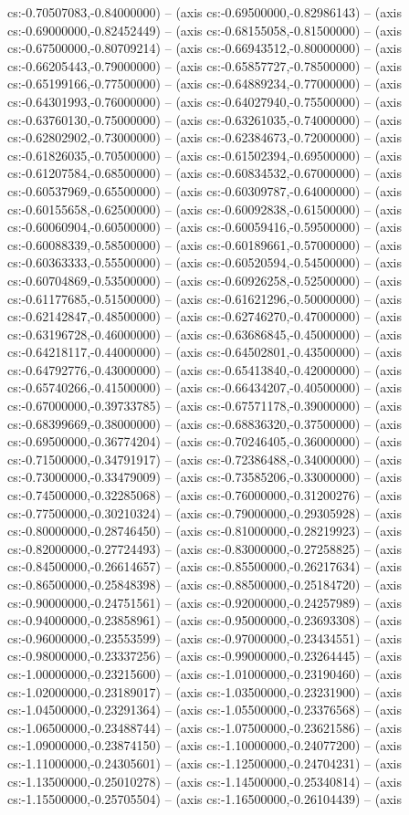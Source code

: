 cs:-0.70507083,-0.84000000) -- (axis cs:-0.69500000,-0.82986143) -- (axis cs:-0.69000000,-0.82452449) -- (axis cs:-0.68155058,-0.81500000) -- (axis cs:-0.67500000,-0.80709214) -- (axis cs:-0.66943512,-0.80000000) -- (axis cs:-0.66205443,-0.79000000) -- (axis cs:-0.65857727,-0.78500000) -- (axis cs:-0.65199166,-0.77500000) -- (axis cs:-0.64889234,-0.77000000) -- (axis cs:-0.64301993,-0.76000000) -- (axis cs:-0.64027940,-0.75500000) -- (axis cs:-0.63760130,-0.75000000) -- (axis cs:-0.63261035,-0.74000000) -- (axis cs:-0.62802902,-0.73000000) -- (axis cs:-0.62384673,-0.72000000) -- (axis cs:-0.61826035,-0.70500000) -- (axis cs:-0.61502394,-0.69500000) -- (axis cs:-0.61207584,-0.68500000) -- (axis cs:-0.60834532,-0.67000000) -- (axis cs:-0.60537969,-0.65500000) -- (axis cs:-0.60309787,-0.64000000) -- (axis cs:-0.60155658,-0.62500000) -- (axis cs:-0.60092838,-0.61500000) -- (axis cs:-0.60060904,-0.60500000) -- (axis cs:-0.60059416,-0.59500000) -- (axis cs:-0.60088339,-0.58500000) -- (axis cs:-0.60189661,-0.57000000) -- (axis cs:-0.60363333,-0.55500000) -- (axis cs:-0.60520594,-0.54500000) -- (axis cs:-0.60704869,-0.53500000) -- (axis cs:-0.60926258,-0.52500000) -- (axis cs:-0.61177685,-0.51500000) -- (axis cs:-0.61621296,-0.50000000) -- (axis cs:-0.62142847,-0.48500000) -- (axis cs:-0.62746270,-0.47000000) -- (axis cs:-0.63196728,-0.46000000) -- (axis cs:-0.63686845,-0.45000000) -- (axis cs:-0.64218117,-0.44000000) -- (axis cs:-0.64502801,-0.43500000) -- (axis cs:-0.64792776,-0.43000000) -- (axis cs:-0.65413840,-0.42000000) -- (axis cs:-0.65740266,-0.41500000) -- (axis cs:-0.66434207,-0.40500000) -- (axis cs:-0.67000000,-0.39733785) -- (axis cs:-0.67571178,-0.39000000) -- (axis cs:-0.68399669,-0.38000000) -- (axis cs:-0.68836320,-0.37500000) -- (axis cs:-0.69500000,-0.36774204) -- (axis cs:-0.70246405,-0.36000000) -- (axis cs:-0.71500000,-0.34791917) -- (axis cs:-0.72386488,-0.34000000) -- (axis cs:-0.73000000,-0.33479009) -- (axis cs:-0.73585206,-0.33000000) -- (axis cs:-0.74500000,-0.32285068) -- (axis cs:-0.76000000,-0.31200276) -- (axis cs:-0.77500000,-0.30210324) -- (axis cs:-0.79000000,-0.29305928) -- (axis cs:-0.80000000,-0.28746450) -- (axis cs:-0.81000000,-0.28219923) -- (axis cs:-0.82000000,-0.27724493) -- (axis cs:-0.83000000,-0.27258825) -- (axis cs:-0.84500000,-0.26614657) -- (axis cs:-0.85500000,-0.26217634) -- (axis cs:-0.86500000,-0.25848398) -- (axis cs:-0.88500000,-0.25184720) -- (axis cs:-0.90000000,-0.24751561) -- (axis cs:-0.92000000,-0.24257989) -- (axis cs:-0.94000000,-0.23858961) -- (axis cs:-0.95000000,-0.23693308) -- (axis cs:-0.96000000,-0.23553599) -- (axis cs:-0.97000000,-0.23434551) -- (axis cs:-0.98000000,-0.23337256) -- (axis cs:-0.99000000,-0.23264445) -- (axis cs:-1.00000000,-0.23215600) -- (axis cs:-1.01000000,-0.23190460) -- (axis cs:-1.02000000,-0.23189017) -- (axis cs:-1.03500000,-0.23231900) -- (axis cs:-1.04500000,-0.23291364) -- (axis cs:-1.05500000,-0.23376568) -- (axis cs:-1.06500000,-0.23488744) -- (axis cs:-1.07500000,-0.23621586) -- (axis cs:-1.09000000,-0.23874150) -- (axis cs:-1.10000000,-0.24077200) -- (axis cs:-1.11000000,-0.24305601) -- (axis cs:-1.12500000,-0.24704231) -- (axis cs:-1.13500000,-0.25010278) -- (axis cs:-1.14500000,-0.25340814) -- (axis cs:-1.15500000,-0.25705504) -- (axis cs:-1.16500000,-0.26104439) -- (axis 
